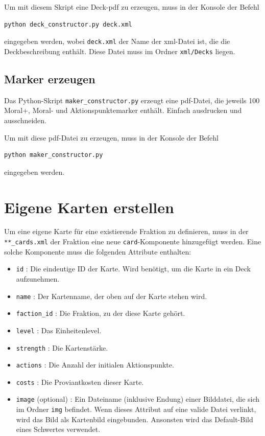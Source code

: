\documentclass[a4paper,11pt]{report}
\begin{document}
Um mit diesem Skript eine Deck-pdf zu erzeugen, muss in der Konsole der Befehl
\begin{lstlisting}
python deck_constructor.py deck.xml
\end{lstlisting}
eingegeben werden, wobei \verb+deck.xml+ der Name der xml-Datei ist, die die Deckbeschreibung enthält. Diese Datei muss im Ordner \verb+xml/Decks+ liegen.

\subsection{Marker erzeugen}
Das Python-Skript \verb+maker_constructor.py+ erzeugt eine pdf-Datei, die jeweils 100 Moral+, Moral- und Aktionspunktemarker enthält. Einfach ausdrucken und ausschneiden.

Um mit diese pdf-Datei zu erzeugen, muss in der Konsole der Befehl
\begin{lstlisting}
python maker_constructor.py
\end{lstlisting}
eingegeben werden.

\section{Eigene Karten erstellen}\label{C:newcard}
Um eine eigene Karte für eine existierende Fraktion zu definieren, muss in der \verb+**_cards.xml+ der Fraktion eine neue \verb+card+-Komponente hinzugefügt werden. Eine solche Komponente muss die folgenden Attribute enthalten:
\begin{itemize}
	\item \verb+id+ : Die eindeutige ID der Karte. Wird benötigt, um die Karte in ein Deck aufzunehmen.
	\item \verb+name+ : Der Kartenname, der oben auf der Karte stehen wird.
	\item \verb+faction_id+ : Die Fraktion, zu der diese Karte gehört.
	\item \verb+level+ : Das Einheitenlevel.
	\item \verb+strength+ : Die Kartenstärke.
	\item \verb+actions+ : Die Anzahl der initialen Aktionspunkte.
	\item \verb+costs+ : Die Proviantkosten dieser Karte.
	\item \verb+image+ (optional) : Ein Dateiname (inklusive Endung) einer Bilddatei, die sich im Ordner \verb+img+ befindet. Wenn dieses Attribut auf eine valide Datei verlinkt, wird das Bild als Kartenbild eingebunden. Ansonsten wird das Default-Bild eines Schwertes verwendet.
\end{itemize}
\end{document}
